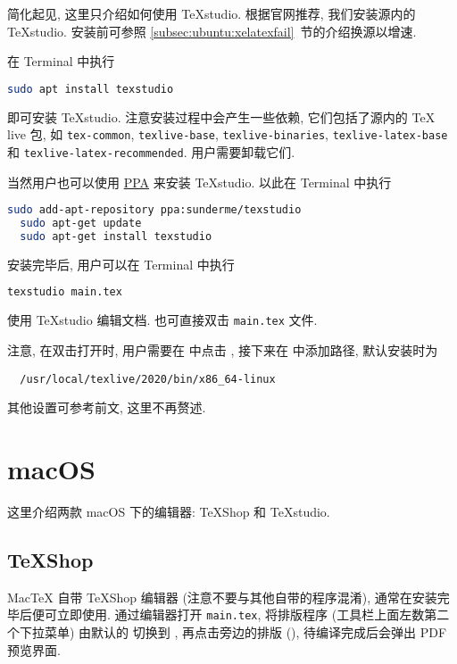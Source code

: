 简化起见, 这里只介绍如何使用 \TeX studio.
根据官网推荐, 我们安装源内的 \TeX studio.
安装前可参照 \ref{subsec:ubuntu:xelatexfail}~节的介绍换源以增速.

在 \textsf{Terminal} 中执行
\begin{lstlisting}[language = bash]
  sudo apt install texstudio
\end{lstlisting}
即可安装 \TeX studio.
注意安装过程中会产生一些依赖, 它们包括了源内的 \TeX{} live 包, 如 \texttt{tex-common}, \texttt{texlive-base}, \texttt{texlive-binaries}, \texttt{texlive-latex-base} 和 \texttt{texlive-latex-recommended}.
用户需要卸载它们.

当然用户也可以使用
\href{https://code.launchpad.net/~sunderme/+archive/ubuntu/texstudio}{PPA}
来安装 \TeX studio.
以此在 \textsf{Terminal} 中执行
\begin{lstlisting}[language = bash]
  sudo add-apt-repository ppa:sunderme/texstudio
  sudo apt-get update
  sudo apt-get install texstudio
\end{lstlisting}

安装完毕后,
用户可以在 \textsf{Terminal} 中执行
\begin{lstlisting}[language = bash]
  texstudio main.tex
\end{lstlisting}
使用 \TeX studio 编辑文档.
也可直接双击 \texttt{main.tex} 文件.

注意, 在双击打开时, 用户需要在
 中点击
,
接下来在 
中添加路径,
默认安装时为
\begin{lstlisting}
  /usr/local/texlive/2020/bin/x86_64-linux
\end{lstlisting}

其他设置可参考前文, 这里不再赘述.

\section{macOS}

这里介绍两款 macOS 下的编辑器:
\TeX Shop 和 \TeX studio.

\subsection{\TeX Shop}

Mac\TeX{} 自带 \TeX Shop 编辑器 (注意不要与其他自带的程序混淆),
通常在安装完毕后便可立即使用.
通过编辑器打开 \texttt{main.tex},
将排版程序 (工具栏上面左数第二个下拉菜单) 由默认的  切换到
,
再点击旁边的排版  (),
待编译完成后会弹出 PDF 预览界面.

